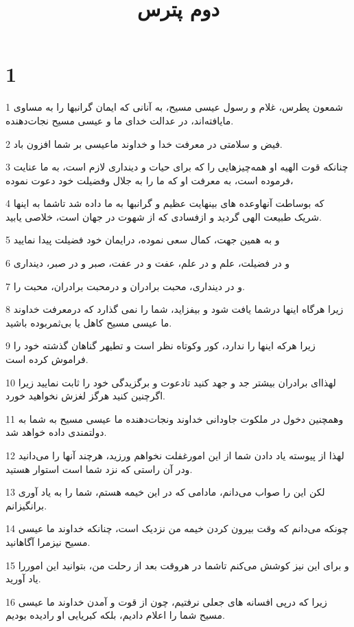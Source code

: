 

\title{دوم پترس}


\chapter{1}

\par 1 شمعون پطرس، غلام و رسول عیسی مسیح، به آنانی که ایمان گرانبها را به مساوی مایافته‌اند، در عدالت خدای ما و عیسی مسیح نجات‌دهنده.
\par 2 فیض و سلامتی در معرفت خدا و خداوند ماعیسی بر شما افزون باد.
\par 3 چنانکه قوت الهیه او همه‌چیزهایی را که برای حیات و دینداری لازم است، به ما عنایت فرموده است، به معرفت او که ما را به جلال وفضیلت خود دعوت نموده،
\par 4 که بوساطت آنهاوعده های بینهایت عظیم و گرانبها به ما داده شد تاشما به اینها شریک طبیعت الهی گردید و ازفسادی که از شهوت در جهان است، خلاصی یابید.
\par 5 و به همین جهت، کمال سعی نموده، درایمان خود فضیلت پیدا نمایید
\par 6 و در فضیلت، علم و در علم، عفت و در عفت، صبر و در صبر، دینداری
\par 7 و در دینداری، محبت برادران و درمحبت برادران، محبت را.
\par 8 زیرا هرگاه اینها درشما یافت شود و بیفزاید، شما را نمی گذارد که درمعرفت خداوند ما عیسی مسیح کاهل یا بی‌ثمربوده باشید.
\par 9 زیرا هرکه اینها را ندارد، کور وکوتاه نظر است و تطیهر گناهان گذشته خود را فراموش کرده است.
\par 10 لهذا‌ای برادران بیشتر جد و جهد کنید تادعوت و برگزیدگی خود را ثابت نمایید زیرا اگرچنین کنید هرگز لغزش نخواهید خورد.
\par 11 وهمچنین دخول در ملکوت جاودانی خداوند ونجات‌دهنده ما عیسی مسیح به شما به دولتمندی داده خواهد شد.
\par 12 لهذا از پیوسته یاد دادن شما از این امورغفلت نخواهم ورزید، هرچند آنها را می‌دانید ودر آن راستی که نزد شما است استوار هستید.
\par 13 لکن این را صواب می‌دانم، مادامی که در این خیمه هستم، شما را به یاد آوری برانگیزانم.
\par 14 چونکه می‌دانم که وقت بیرون کردن خیمه من نزدیک است، چنانکه خداوند ما عیسی مسیح نیزمرا آگاهانید.
\par 15 و برای این نیز کوشش می‌کنم تاشما در هروقت بعد از رحلت من، بتوانید این اموررا یاد آورید.
\par 16 زیرا که در‌پی افسانه های جعلی نرفتیم، چون از قوت و آمدن خداوند ما عیسی مسیح شما را اعلام دادیم، بلکه کبریایی او رادیده بودیم.
